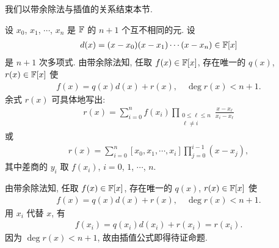 我们以带余除法与插值的关系结束本节.

\begin{proposition}
    设 $x_0$, $x_1$, $\cdots$, $x_{n}$ 是 $\mathbb{F}$ 的 $n+1$ 个互不相同的元. 设
    \begin{align*}
        d(x) = (x - x_0) (x - x_1) \cdots (x - x_n) \in \mathbb{F}[x]
    \end{align*}
    是 $n+1$ 次多项式. 由带余除法知, 任取 $f(x) \in \mathbb{F}[x]$, 存在唯一的 $q(x)$, $r(x) \in \mathbb{F}[x]$ 使
    \begin{align*}
        f(x) = q(x) d(x) + r(x), \quad \deg r(x) < n + 1.
    \end{align*}
    余式 $r(x)$ 可具体地写出:
    \begin{align*}
        r(x) = \sum_{i = 0}^{n} f(x_i) \prod_{\begin{smallmatrix}0 \leq \ell \leq n \\\ell \neq i\end{smallmatrix}} \frac{x - x_\ell}{x_i - x_\ell}
    \end{align*}
    或
    \begin{align*}
        r(x) = \sum_{i = 0}^{n} [x_0, x_1, \cdots, x_i] \prod_{j = 0}^{i - 1} (x - x_j),
    \end{align*}
    其中差商的 $y_i$ 取 $f(x_i)$, $i = 0$, $1$, $\cdots$, $n$.
\end{proposition}

\begin{pf}
    由带余除法知, 任取 $f(x) \in \mathbb{F}[x]$, 存在唯一的 $q(x)$, $r(x) \in \mathbb{F}[x]$ 使
    \begin{align*}
        f(x) = q(x) d(x) + r(x), \quad \deg r(x) < n + 1.
    \end{align*}
    用 $x_i$ 代替 $x$, 有
    \begin{align*}
        f(x_i) = q(x_i) d(x_i) + r(x_i) = r(x_i).
    \end{align*}
    因为 $\deg r(x) < n + 1$, 故由插值公式即得待证命题.
\end{pf}
